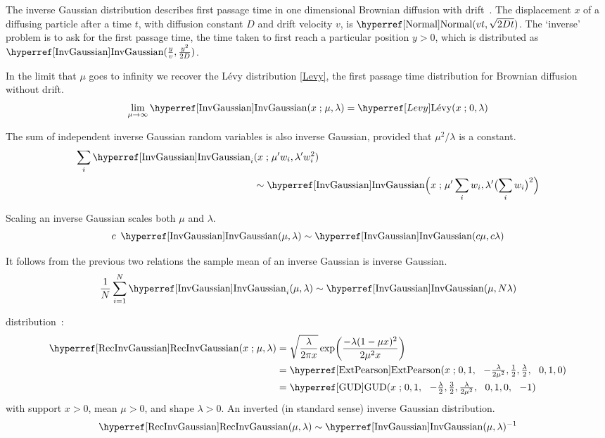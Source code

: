 The inverse Gaussian distribution describes first passage time in one dimensional Brownian diffusion with drift~\cite{Chhikara1989}. The displacement $x$ of a diffusing particle after a time $t$, with diffusion constant $D$ and drift velocity $v$,  is $\opr{Normal}(vt, \sqrt{2 D t})$. The `inverse' problem is to ask for the first passage time, the time taken to first reach a particular position $y>0$, which is distributed as $\opr{InvGaussian}(\tfrac{y}{v},\tfrac{y^2}{2D})$. 

In the limit that $\mu$ goes to infinity we recover the L\'evy distribution \eqref{Levy}, the first passage time distribution for Brownian diffusion without drift.
\[
\lim_{\mu\rightarrow\infty} \opr{InvGaussian}(x\given \mu, \lambda) = \Levy(x\given 0,\lambda) \checked
\notag
\]

The sum of independent inverse Gaussian random variables is also inverse Gaussian, provided that $\mu^2/\lambda$ is a constant.
\begin{align*}
\sum_i \opr{InvGaussian}_i &(x\given \mu' w_i, \lambda' w_i^2)
\\
& \sim \opr{InvGaussian}\Bigl(x\given \mu' \sum_i w_i, \lambda' \bigl(\sum_i w_i\bigr)^2 \Bigr) \checked
\end{align*}

Scaling an inverse Gaussian scales both $\mu$ and $\lambda$. 
\[
c\ \opr{InvGaussian} (\mu, \lambda) \sim \opr{InvGaussian} (c \mu, c \lambda) \checked
\notag
\]

It follows from the previous two relations the sample mean of an inverse Gaussian is inverse Gaussian.
\[
\frac{1}{N} \sum_{i=1}^N \opr{InvGaussian}_i (\mu, \lambda) \sim \opr{InvGaussian} (\mu, N \lambda) \checked
\notag 
\]



 distribution~\cite{Johnson1994}: 
\begin{align}
\label{RecInvGaussian}
\opr{RecInvGaussian}(x\given \mu,\lambda) &= \sqrt{\frac{\lambda}{2\pi x}} \exp\Left(\frac{-\lambda (1-\mu x)^2}{2\mu^2 x}\Right) \checked
\\ \notag
& = \opr{ExtPearson}(x\given 0,1 \sep -\tfrac{\lambda}{2\mu^2}, \tfrac{1}{2}, \tfrac{\lambda}{2} \sep 0, 1,0) \checked
\\ \notag
& = \opr{GUD}(x\given 0,1 \sep -\tfrac{\lambda}{2}, \tfrac{3}{2}, \tfrac{\lambda}{2\mu^2} \sep 0, 1,0 \sep -1) \checked
\end{align}
with support $x>0$, mean $\mu>0$, and shape $\lambda>0$. An inverted (in standard sense) inverse Gaussian distribution. 
\[
\opr{RecInvGaussian}(\mu,\lambda) \sim \opr{InvGaussian}(\mu,\lambda)^{-1}
\notag
\]



